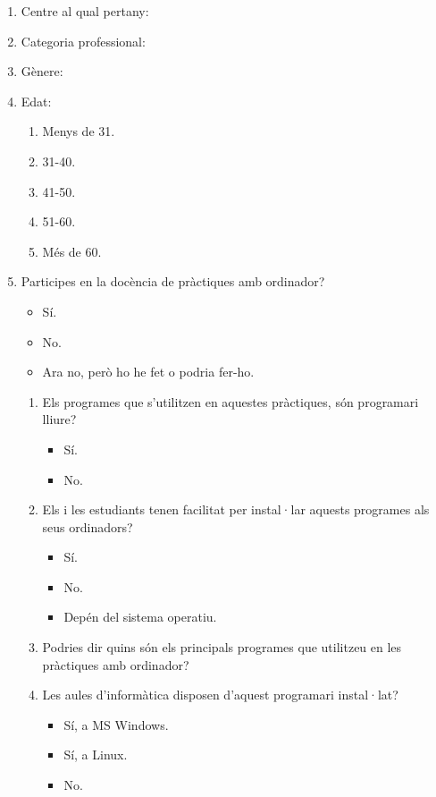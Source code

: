 \documentclass[a4paper,12pt]{article}
\begin{document}
\begin{enumerate}
\item Centre al qual pertany:
\item Categoria professional:
\item Gènere:
\item Edat:
   \begin{enumerate}
   \item Menys de 31.
   \item 31-40.
   \item 41-50.
   \item 51-60.
   \item Més de 60.
   \end{enumerate}

\item Participes en la docència de pràctiques amb ordinador?
   \begin{itemize}
   \item Sí.
   \item No.
   \item Ara no, però ho he fet o podria fer-ho.
   \end{itemize}

   \begin{enumerate}
   \item Els programes que s'utilitzen en aquestes pràctiques, són programari lliure?
      \begin{itemize}
      \item Sí.
      \item No.
      \end{itemize}

   \item Els i les estudiants tenen facilitat per instal·lar aquests programes als seus ordinadors?
      \begin{itemize}
      \item Sí.
      \item No.
      \item Depén del sistema operatiu.
      \end{itemize}

   \item Podries dir quins són els principals programes que utilitzeu en les pràctiques amb ordinador?
   \vspace*{1cm}

   \item Les aules d'informàtica disposen d'aquest programari instal·lat?
      \begin{itemize}
      \item Sí, a MS Windows.
      \item Sí, a Linux.
      \item No.
      \end{itemize}


\end{enumerate}
\end{enumerate}
\end{document}
